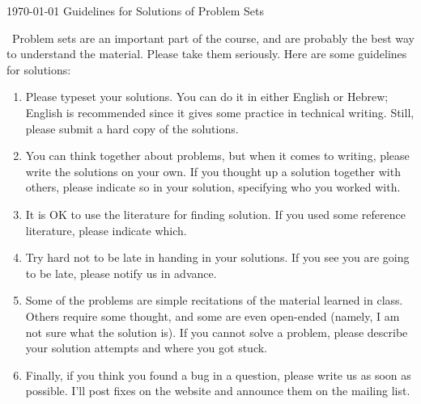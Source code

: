 \documentclass{article}
\newcommand{\handout}[7]{{
\begin{center}
\begin{minipage}{14cm}
    \setlength{\parindent}{0cm}%
    \fbox{\vbox{%
        {#1}%
        \hfill
        #2

        \center{\Large\bf{#5}}

        \emph{#3}\hfill #4
    }}%
    \vskip0pt
    \vbox{\hfill  #6}%
\end{minipage}
\end{center}
\vspace{2cm}
}}
\begin{document}
        {}
        {\today}
        {}
        {Guidelines for Solutions of Problem Sets} %

~Problem sets are an important part of the course, and are probably the best way
to understand the material. Please take them seriously. Here are some
guidelines for solutions:
\begin{enumerate}
\item
Please typeset your solutions. You can do it in either English or Hebrew;
English is recommended since it gives some practice in technical writing.
Still, please submit a hard copy of the solutions.
\item
You can think together about problems, but when it comes to writing,
please write the solutions on your own. If you thought up a solution together
with others, please indicate so in your solution, specifying who you worked
with.
\item
It is OK to use the literature for finding solution. If you used some reference literature, please indicate which.
\item
Try hard not to be late in handing in your solutions.
If you see you are going to be late, please notify us in advance.
\item
Some of the problems are simple recitations of the material learned in class.
Others require some thought, and some are even open-ended (namely, I am not
sure what the solution is). If you cannot solve a problem, please describe your solution attempts and where you got stuck.
\item
Finally, if you think you found a bug in a question, please write us  as
soon as possible. I'll post fixes on the website and announce them on the
mailing list.
\end{enumerate}
\end{document}
